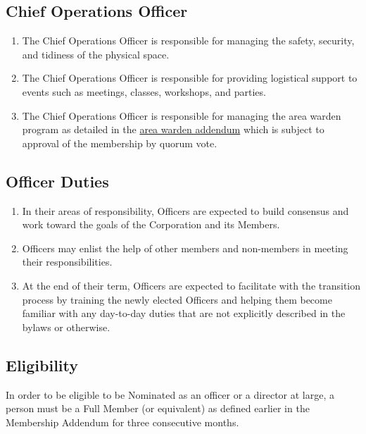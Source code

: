 \documentclass{article}
\begin{document}
\subsection{Chief Operations Officer}
\begin{enumerate}
\item The Chief Operations Officer is responsible for managing the safety, security, and 
tidiness of the physical space.
\item The Chief Operations Officer is responsible for providing logistical support to events 
such as meetings, classes, workshops, and parties.
\item The Chief Operations Officer is responsible for managing the area warden program as
  detailed in the \href{https://github.com/Hive13/bylaws-and-membership-addendum/raw/master/warden-addendum.pdf}{area warden addendum} which is subject to approval of the membership by
quorum vote.
\end{enumerate}
\subsection{Officer Duties}
\begin{enumerate}
\item In their areas of responsibility, Officers are expected to build consensus and work 
toward the goals of the Corporation and its Members.
\item Officers may enlist the help of other members and non-members in meeting their 
responsibilities.
\item At the end of their term, Officers are expected to facilitate with the transition 
process by training the newly elected Officers and helping them become familiar with any 
day-to-day duties that are not explicitly described in the bylaws or otherwise.
\end{enumerate}
\subsection{Eligibility}
In order to be eligible to be Nominated as an officer or a director at large, a person must 
be a Full Member (or equivalent) as defined earlier in the Membership Addendum for three 
consecutive months.
\end{document}
